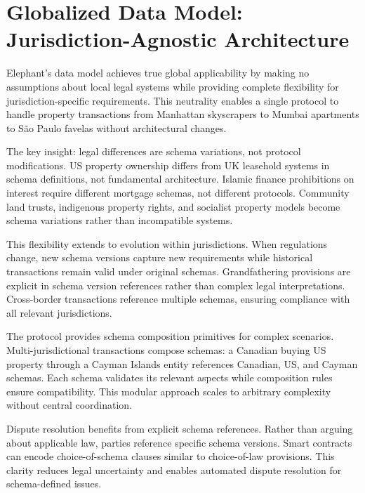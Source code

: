 \section{Globalized Data Model: Jurisdiction-Agnostic Architecture}

Elephant's data model achieves true global applicability by making no assumptions about local legal systems while providing complete flexibility for jurisdiction-specific requirements. This neutrality enables a single protocol to handle property transactions from Manhattan skyscrapers to Mumbai apartments to São Paulo favelas without architectural changes.

The key insight: legal differences are schema variations, not protocol modifications. US property ownership differs from UK leasehold systems in schema definitions, not fundamental architecture. Islamic finance prohibitions on interest require different mortgage schemas, not different protocols. Community land trusts, indigenous property rights, and socialist property models become schema variations rather than incompatible systems.

This flexibility extends to evolution within jurisdictions. When regulations change, new schema versions capture new requirements while historical transactions remain valid under original schemas. Grandfathering provisions are explicit in schema version references rather than complex legal interpretations. Cross-border transactions reference multiple schemas, ensuring compliance with all relevant jurisdictions.

The protocol provides schema composition primitives for complex scenarios. Multi-jurisdictional transactions compose schemas: a Canadian buying US property through a Cayman Islands entity references Canadian, US, and Cayman schemas. Each schema validates its relevant aspects while composition rules ensure compatibility. This modular approach scales to arbitrary complexity without central coordination.

Dispute resolution benefits from explicit schema references. Rather than arguing about applicable law, parties reference specific schema versions. Smart contracts can encode choice-of-schema clauses similar to choice-of-law provisions. This clarity reduces legal uncertainty and enables automated dispute resolution for schema-defined issues.

